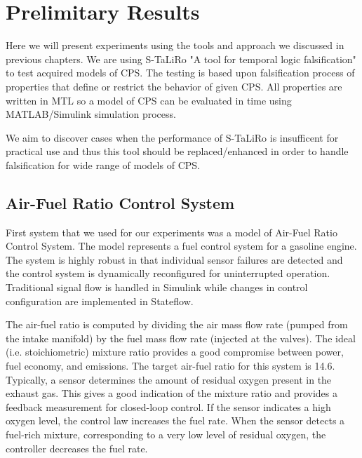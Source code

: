 \chapter{Prelimitary Results}
\label{chap.mainresults}

Here we will present experiments using the tools and approach we discussed in previous chapters. We are using S-TaLiRo "A tool for temporal logic falsification" to test acquired models of CPS. The testing is based upon falsification process of properties that define or restrict the behavior of given CPS. All properties are written in MTL so a model of CPS can be evaluated in time using MATLAB/Simulink simulation process.

We aim to discover cases when the performance of S-TaLiRo is insufficent for practical use and thus this tool should be replaced/enhanced in order to handle falsification for wide range of models of CPS. 

\section{Air-Fuel Ratio Control System}

First system that we used for our experiments was a model of Air-Fuel Ratio Control System. The model represents a fuel control system for a gasoline engine. The system is highly robust in that individual sensor failures are detected and the control system is dynamically reconfigured for uninterrupted operation. Traditional signal flow is handled in Simulink while changes in control configuration are implemented in Stateflow.

The air-fuel ratio is computed by dividing the air mass flow rate (pumped from the intake manifold) by the fuel mass flow rate (injected at the valves). The ideal (i.e. stoichiometric) mixture ratio provides a good compromise between power, fuel economy, and emissions. The target air-fuel ratio for this system is 14.6. Typically, a sensor determines the amount of residual oxygen present in the exhaust gas. This gives a good indication of the mixture ratio and provides a feedback measurement for closed-loop control. If the sensor indicates a high oxygen level, the control law increases the fuel rate. When the sensor detects a fuel-rich mixture, corresponding to a very low level of residual oxygen, the controller decreases the fuel rate.

